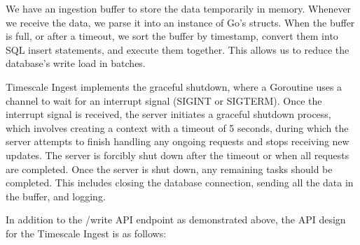 We have an ingestion buffer to store the data temporarily in memory. Whenever we receive the data, we parse it into an instance of Go's structs. When the buffer is full, or after a timeout, we sort the buffer by timestamp, convert them into SQL insert statements, and execute them together. This allows us to reduce the database's write load in batches.

Timescale Ingest implements the graceful shutdown, where a Goroutine uses a channel to wait for an interrupt signal (SIGINT or SIGTERM). Once the interrupt signal is received, the server initiates a graceful shutdown process, which involves creating a context with a timeout of 5 seconds, during which the server attempts to finish handling any ongoing requests and stops receiving new updates. The server is forcibly shut down after the timeout or when all requests are completed. Once the server is shut down, any remaining tasks should be completed. This includes closing the database connection, sending all the data in the buffer, and logging.

In addition to the /write API endpoint as demonstrated above, the API design for the Timescale Ingest is as follows:

